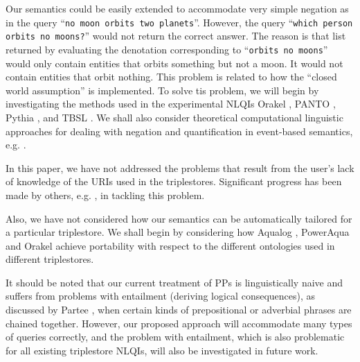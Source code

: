 \documentclass[../main.tex]{subfiles}
\begin{document}
\begin{refsection}
Our semantics could be easily extended to accommodate very simple negation as in the query ``\texttt{no moon orbits two planets}''. However, the query ``\texttt{which person orbits no moons?}'' would not return the correct answer. The reason is that list returned by evaluating the denotation corresponding to ``\texttt{orbits no moons}'' would only contain entities that orbits something but not a moon. It would not contain entities that orbit nothing. This problem is related to how the ``closed world assumption'' is implemented. To solve tis problem, we will begin by investigating the methods used in the experimental NLQIs Orakel \cite{cimiano:haase}, PANTO \cite{wang2007panto}, Pythia \cite{unger:cimiano}, and TBSL \cite{hoffner2013user}. We shall also consider theoretical computational linguistic approaches for dealing with negation and quantification in event-based semantics, e.g. \cite{champollion2010quantification}.

In this paper, we have not addressed the problems that result from the user's lack of knowledge of the URIs used in the triplestores. Significant progress has been made by others, e.g. \cite{walter:unger}, in tackling this problem.

Also, we have not considered how our semantics can be automatically tailored for a particular triplestore. We shall begin by considering how Aqualog \cite{lopez:aqualog}, PowerAqua \cite{lopez:2012} and Orakel \cite{cimiano:haase} achieve portability with respect to the different ontologies used in different triplestores.

It should be noted that our current treatment of PPs is linguistically naive and suffers from problems with entailment (deriving logical consequences), as discussed by Partee \cite{partee2005formal}, when certain kinds of prepositional or adverbial phrases are chained together. However, our proposed approach will accommodate many types of queries correctly, and the problem with entailment, which is also problematic for all existing triplestore NLQIs, will also be investigated in future work.


\end{refsection}
\end{document}
